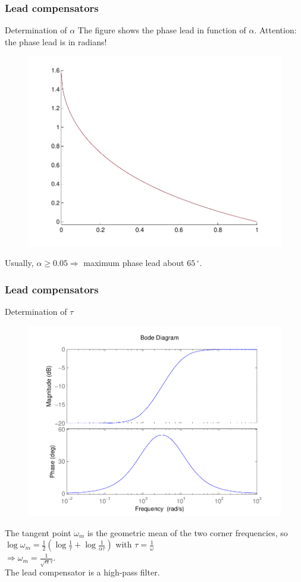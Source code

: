 \begin{frame}
	\frametitle{Lead compensators}
	\begin{block}{Determination of $\alpha$}
	The figure shows the phase lead in function of $\alpha$. Attention: the phase lead is in radians!
	\begin{figure}
		\centering
		\includegraphics[width=0.5
		\linewidth]{alphavsphi}
	\end{figure}
	Usually, $\alpha \geqslant 0.05 \Rightarrow$ maximum phase lead about $65\,^{\circ}$.
	\end{block}
\end{frame}

\begin{frame}
\frametitle{Lead compensators}
	\begin{block}{Determination of $\tau$}
		\begin{figure}
			\centering
			\includegraphics[width=0.5
			\linewidth]{bodelead}
		\end{figure}
		The tangent point $\omega_m$ is the geometric mean of the two corner frequencies, so
		$ \log \omega_m = \frac{1}{2}(\log \frac{1}{\tau} + \log \frac{1}{\alpha\tau})$ with $\tau = \frac{1}{\omega}$
		\\ $\Rightarrow \omega_m = \frac{1}{\sqrt{\alpha}\tau}$. \\
		The lead compensator is a high-pass filter.
	\end{block}
\end{frame}

